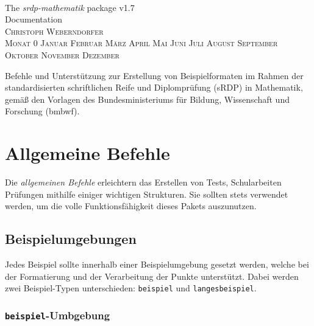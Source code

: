 \documentclass[a4paper,12pt]{article}
\makeatletter
\renewcommand*\tableofcontents{\@starttoc{toc}}
\newcommand{\Monat}{%
\ifcase\month
 Monat 0 \or Januar \or Februar \or März  \or April \or Mai \or Juni \or Juli%
 \or August \or September \or Oktober \or November \or Dezember
\fi}
\makeatother
\begin{document}
\begin{titlepage}
\thispagestyle{empty}
\begin{center}
~

\vfill

\Huge The \textit{srdp-mathematik} package v1.7\\[1cm]

Documentation \\ [1cm]

\flushright
\textsc{\large Christoph Weberndorfer} \\[-0.5cm]
\textsc{\large \Monat~\the\year} \\
\vfill

\centering
\normalsize 
Befehle und Unterstützung zur Erstellung von Beispielformaten im Rahmen der standardisierten schriftlichen Reife und Diplomprüfung (sRDP) in Mathematik, gemäß den Vorlagen des Bundesministeriums für Bildung, Wissenschaft und Forschung (bmbwf). 
\vfill 

\begingroup
\let\cleardoublepage\relax
\let\clearpage\relax
\normalsize \tableofcontents
\endgroup

\leer


\end{center}


\end{titlepage}


\section{Allgemeine Befehle}
Die \textit{allgemeinen Befehle} erleichtern das Erstellen von Tests, Schularbeiten Prüfungen mithilfe einiger wichtigen Strukturen. Sie sollten stets verwendet werden, um die volle Funktionsfähigkeit dieses Pakets auszunutzen. 
\vspace{1cm}

\subsection{Beispielumgebungen}

Jedes Beispiel sollte innerhalb einer Beispielumgebung gesetzt werden, welche bei der Formatierung und der Verarbeitung der Punkte unterstützt. Dabei werden zwei Beispiel-Typen unterschieden: \texttt{beispiel} und \texttt{langesbeispiel}.   

\vspace{1cm}
\subsubsection{\texttt{beispiel}-Umbgebung}
\end{document}
